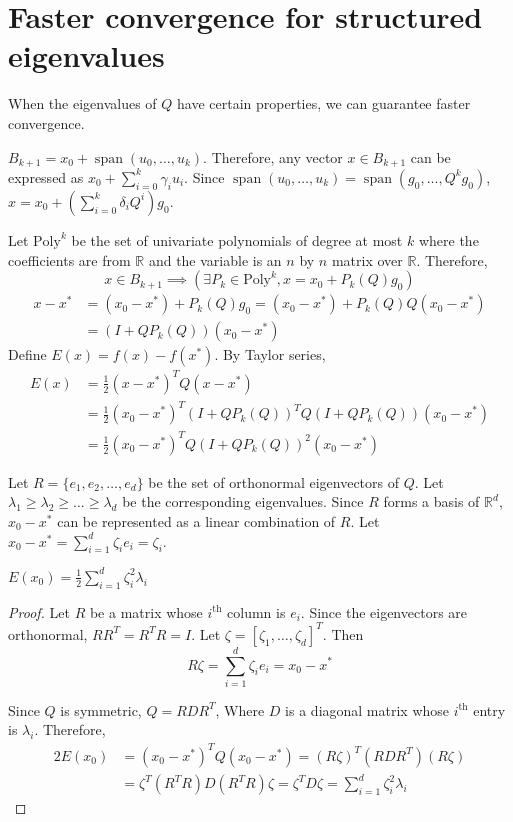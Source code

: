 \section{Faster convergence for structured eigenvalues}

\newcommand*{\MatPoly}[1]{\textrm{Poly}^{#1}}

When the eigenvalues of $Q$ have certain properties,
we can guarantee faster convergence.

$B_{k+1} = x_0 + \operatorname{span}(u_0, \ldots, u_k)$.
Therefore, any vector $x \in B_{k+1}$ can be expressed as $x_0 + \sum_{i=0}^k \gamma_i u_i$.
Since $\operatorname{span}(u_0, \ldots, u_k) = \operatorname{span}(g_0, \ldots, Q^kg_0)$,
$x = x_0 + \left(\sum_{i=0}^k \delta_i Q^i\right)g_0$.

Let $\MatPoly{k}$ be the set of univariate polynomials of degree at most $k$
where the coefficients are from $\mathbb{R}$ and the variable is
an $n$ by $n$ matrix over $\mathbb{R}$. Therefore,
\[ x \in B_{k+1} \implies \left( \exists P_k \in \MatPoly{k}, x = x_0 + P_k(Q)g_0 \right) \]
\begin{align*}
x - x^* &= (x_0 - x^*) + P_k(Q)g_0
= (x_0 - x^*) + P_k(Q)Q(x_0 - x^*)
\\ &= (I + QP_k(Q))(x_0 - x^*)
\end{align*}
Define $E(x) = f(x) - f(x^*)$.
By Taylor series,
\begin{align*}
E(x) &= \frac{1}{2} (x-x^*)^TQ(x-x^*)
\\ &= \frac{1}{2} (x_0 - x^*)^T(I + QP_k(Q))^TQ(I+QP_k(Q))(x_0 - x^*)
\\ &= \frac{1}{2} (x_0 - x^*)^T Q(I + QP_k(Q))^2 (x_0 - x^*)
\end{align*}

Let $R = \{e_1, e_2, \ldots, e_d\}$ be the set of orthonormal eigenvectors of $Q$.
Let $\lambda_1 \ge \lambda_2 \ge \ldots \ge \lambda_d$ be the corresponding eigenvalues.
Since $R$ forms a basis of $\mathbb{R}^d$, $x_0 - x^*$ can be represented as a linear combination of $R$.
Let $x_0 - x^* = \sum_{i=1}^d \zeta_i e_i = \zeta_i$.

\begin{lemma}
$E(x_0) = \frac{1}{2} \sum_{i=1}^d \zeta_i^2 \lambda_i$
\end{lemma}
\begin{proof}
Let $R$ be a matrix whose $i^{\textrm{th}}$ column is $e_i$.
Since the eigenvectors are orthonormal, $RR^T = R^TR = I$.
Let $\zeta = [\zeta_1, \ldots, \zeta_d]^T$. Then
\[ R\zeta = \sum_{i=1}^d \zeta_i e_i = x_0 - x^* \]

Since $Q$ is symmetric, $Q = RDR^T$,
Where $D$ is a diagonal matrix whose $i^{\textrm{th}}$ entry is $\lambda_i$.
Therefore,
\begin{align*}
2E(x_0) &= (x_0 - x^*)^T Q (x_0 - x^*) = (R\zeta)^T(RDR^T)(R\zeta)
\\ &= \zeta^T (R^TR) D (R^TR) \zeta = \zeta^T D \zeta = \sum_{i=1}^d \zeta_i^2 \lambda_i
\end{align*}
\end{proof}

